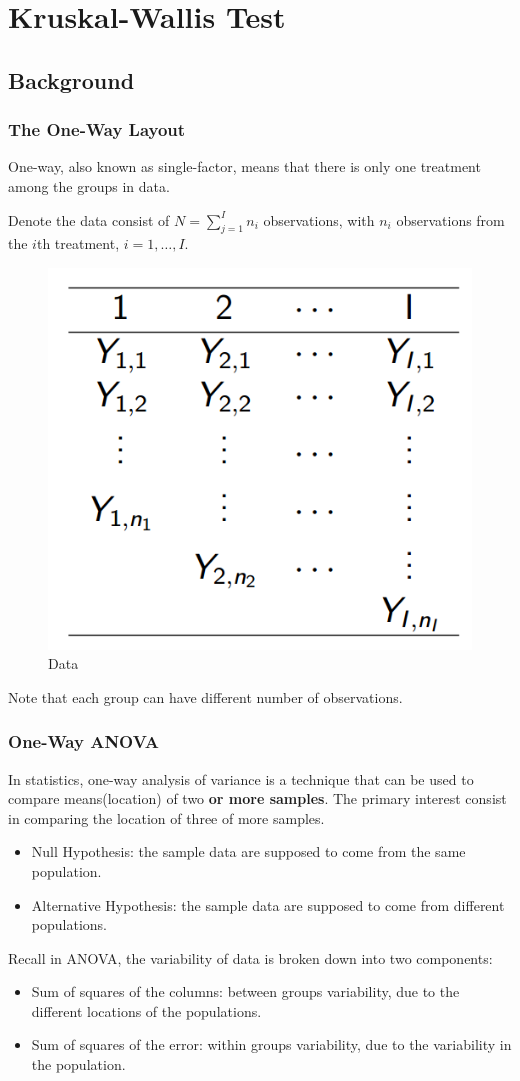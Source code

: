 \section{Kruskal-Wallis Test}
\subsection{Background}
\subsubsection{The One-Way Layout}
One-way, also known as single-factor, means that there is only one treatment among the groups in data. 

Denote the data consist of $N=\sum_{j=1}^{I} n_i$ observations, with $n_i$ observations from the $i$th treatment, $i=1, \dots, I$.

\begin{figure}[H]
	\centering
	\includegraphics[width=0.3\linewidth]{fig/data}
	\caption{Data}
	\label{fig:data}
\end{figure}

Note that each group can have different number of observations.
\subsubsection{One-Way ANOVA}
In statistics, one-way analysis of variance is a technique that can be used to compare means(location) of two \textbf{or more samples}. The primary interest consist in comparing the location of three of more samples.

\begin{itemize}
	\item Null Hypothesis: the sample data are supposed to come from the same population.
	\item Alternative Hypothesis: the sample data are supposed to come from different populations.
\end{itemize}

Recall in ANOVA, the variability of data is broken down into two components:
\begin{itemize}
	\item Sum of squares of the columns: between groups variability, due to the different locations of the populations.
	\item Sum of squares of the error: within groups variability, due to the variability in the population.
\end{itemize}

